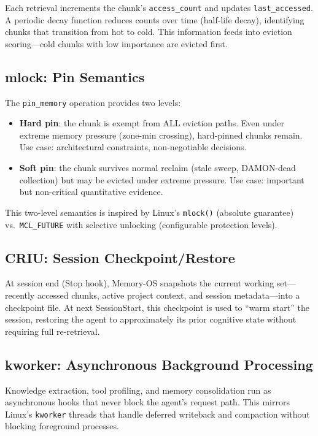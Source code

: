 \documentclass[10pt,twocolumn]{article}
\begin{document}
Each retrieval increments the chunk's \texttt{access\_count} and updates \texttt{last\_accessed}. A periodic decay function reduces counts over time (half-life decay), identifying chunks that transition from hot to cold. This information feeds into eviction scoring---cold chunks with low importance are evicted first.

\subsection{mlock: Pin Semantics}

The \texttt{pin\_memory} operation provides two levels:
\begin{itemize}[leftmargin=*,nosep]
  \item \textbf{Hard pin}: the chunk is exempt from ALL eviction paths. Even under extreme memory pressure (zone-min crossing), hard-pinned chunks remain. Use case: architectural constraints, non-negotiable decisions.
  \item \textbf{Soft pin}: the chunk survives normal reclaim (stale sweep, DAMON-dead collection) but may be evicted under extreme pressure. Use case: important but non-critical quantitative evidence.
\end{itemize}

This two-level semantics is inspired by Linux's \texttt{mlock()} (absolute guarantee) vs.\ \texttt{MCL\_FUTURE} with selective unlocking (configurable protection levels).

\subsection{CRIU: Session Checkpoint/Restore}

At session end (Stop hook), Memory-OS snapshots the current working set---recently accessed chunks, active project context, and session metadata---into a checkpoint file. At next SessionStart, this checkpoint is used to ``warm start'' the session, restoring the agent to approximately its prior cognitive state without requiring full re-retrieval.

\subsection{kworker: Asynchronous Background Processing}

Knowledge extraction, tool profiling, and memory consolidation run as asynchronous hooks that never block the agent's request path. This mirrors Linux's \texttt{kworker} threads that handle deferred writeback and compaction without blocking foreground processes.
\end{document}
